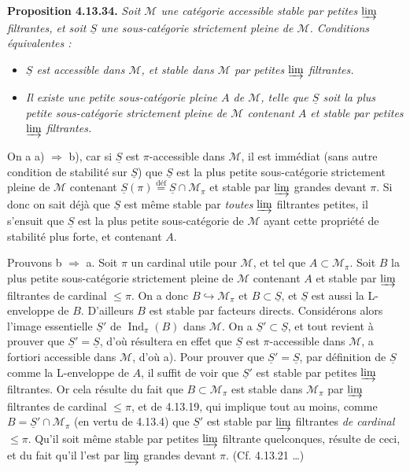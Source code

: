 \documentclass[11pt]{article}
\newcommand{\msp}[1]{\marginpar{\footnotesize [#1]}}
\newcommand{\Ind}{\operatorname{Ind}}
\newcommand{\limind}{\varinjlim}
\newcommand{\defeq}{\overset{\text{déf}}{=}}
\begin{document}
\textbf{Proposition 4.13.34.} \textit{Soit $\mathcal{M}$ une catégorie accessible stable par petites $\limind$ filtrantes, et soit $\underline{S}$ une sous-catégorie strictement pleine de $\mathcal{M}$. Conditions équivalentes :}
\begin{itemize}[leftmargin=2.5em]
\item[\textit{a)}] \textit{$\underline{S}$ est accessible dans $\mathcal{M}$, et stable dans $\mathcal{M}$ par petites $\limind$ filtrantes.}
\item[\textit{b)}] \textit{Il existe une petite sous-catégorie pleine $A$ de $\mathcal{M}$, telle que $\underline{S}$ soit la plus petite sous-catégorie strictement pleine de $\mathcal{M}$ contenant $A$ et stable par petites $\limind$ filtrantes.}
\end{itemize}

\msp{page 356}

On a a) $\Longrightarrow$ b), car si $\underline{S}$ est $\pi$-accessible dans $\mathcal{M}$, il est immédiat (sans autre condition de stabilité sur $\underline{S}$) que $\underline{S}$ est la plus petite sous-catégorie strictement pleine de $\mathcal{M}$ contenant $\underline{S}(\pi) \defeq \underline{S}\cap\mathcal{M}_\pi$ et stable par $\limind$ grandes devant $\pi$. Si donc on sait déjà que $\underline{S}$ est même stable par \textit{toutes} $\limind$ filtrantes petites, il s'ensuit que $\underline{S}$ est la plus petite sous-catégorie de $\mathcal{M}$ ayant cette propriété de stabilité plus forte, et contenant $A$.

Prouvons b $\Longrightarrow$ a. Soit $\pi$ un cardinal utile pour $\mathcal{M}$, et tel que $A \subset \mathcal{M}_\pi$. Soit $B$ la plus petite sous-catégorie strictement pleine de $\mathcal{M}$ contenant $A$ et stable par $\limind$ filtrantes de cardinal $\leqslant \pi$. On a donc $B \hookrightarrow \mathcal{M}_\pi$ et $B \subset \underline{S}$, et $\underline{S}$ est aussi la L-enveloppe de $B$. D'ailleurs $B$ est stable par
\msp{page 357}
facteurs directs. Considérons alors l'image essentielle $\underline{S}'$ de $\Ind_\pi(B)$ dans $\mathcal{M}$. On a $\underline{S}' \subset \underline{S}$, et tout revient à prouver que $\underline{S}' = \underline{S}$, d'où résultera en effet que $\underline{S}$ est $\pi$-accessible dans $\mathcal{M}$, a fortiori accessible dans $\mathcal{M}$, d'où a). Pour prouver que $\underline{S}' = \underline{S}$, par définition de $\underline{S}$ comme la L-enveloppe de $A$, il suffit de voir que $\underline{S}'$ est stable par petites $\limind$ filtrantes. Or cela résulte du fait que $B \subset \mathcal{M}_\pi$ est stable dans $\mathcal{M}_\pi$ par $\limind$ filtrantes de cardinal $\leqslant \pi$, et de 4.13.19, qui implique tout au moins, comme $B = \underline{S}' \cap \mathcal{M}_\pi$ (en vertu de 4.13.4) que $\underline{S}'$ est stable par $\limind$ filtrantes \textit{de cardinal} $\leqslant \pi$. Qu'il soit même stable par petites $\limind$ filtrante quelconques, résulte de ceci, et du fait qu'il l'est par $\limind$ grandes devant $\pi$. (Cf. 4.13.21 \dots) %
\end{document}

